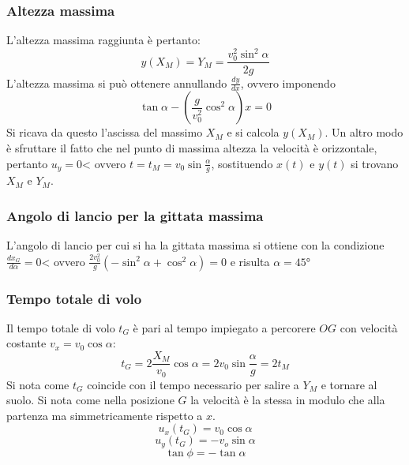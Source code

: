 		\subsubsection{Altezza massima}
		L'altezza massima raggiunta \`e pertanto:
		$$y(X_M)=Y_M=\dfrac{v_0^2\sin^2\alpha}{2g}$$
		L'altezza massima si pu\`o ottenere annullando $\frac{dy}{dx}$, ovvero imponendo
		$$\tan\alpha-(\dfrac{g}{v_0^2}\cos^2\alpha)x=0$$
		Si ricava da questo l'ascissa del massimo $X_M$ e si calcola $y(X_M)$.
		Un altro modo \`e sfruttare il fatto che nel punto di massima altezza la velocit\`a \`e orizzontale, pertanto $u_y=0$< ovvero $t=t_M=v_0\sin\frac{\alpha}{g}$, sostituendo $x(t)$ e $y(t)$ si trovano $X_M$ e $Y_M$.

		\subsubsection{Angolo di lancio per la gittata massima}
		L'angolo di lancio per cui si ha la gittata massima si ottiene con la condizione $\frac{dx_G}{d\alpha}=0$< ovvero $\frac{2v_0^2}{g}(-\sin^2\alpha+\cos^2\alpha)=0$ e risulta $\alpha=45\si{\degree}$

		\subsubsection{Tempo totale di volo}
		Il tempo totale di volo $t_G$ \`e pari al tempo impiegato a percorere $OG$ con velocit\`a costante $v_x=v_0\cos\alpha$:
		$$t_G=2\dfrac{X_M}{v_0}\cos\alpha=2v_0\sin\dfrac{\alpha}{g}=2t_M$$
		Si nota come $t_G$ coincide con il tempo necessario per salire a $Y_M$ e tornare al suolo.
		Si nota come nella posizione $G$ la velocit\`a \`e la stessa in modulo che alla partenza ma simmetricamente rispetto a $x$.
		$$u_x(t_G)=v_0\cos\alpha$$
		$$u_y(t_G)=-v_o\sin\alpha$$
		$$\tan\phi=-\tan\alpha$$

